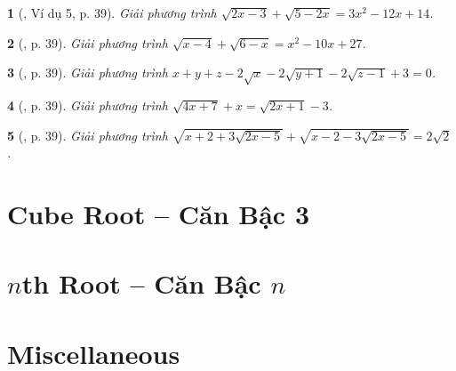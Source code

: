 \documentclass{article}
\newtheorem{baitoan}{}%
\begin{document}
\begin{baitoan}[\cite{Binh_boi_duong_Toan_9_tap_1}, Ví dụ 5, p. 39]
	Giải phương trình $\sqrt{2x - 3} + \sqrt{5 - 2x} = 3x^2 - 12x + 14$.
\end{baitoan}

\begin{baitoan}[\cite{Binh_boi_duong_Toan_9_tap_1}, p. 39]
	Giải phương trình $\sqrt{x - 4} + \sqrt{6 - x} = x^2 - 10x + 27$.
\end{baitoan}

\begin{baitoan}[\cite{Binh_boi_duong_Toan_9_tap_1}, p. 39]
	Giải phương trình $x + y + z - 2\sqrt{x} -2\sqrt{y + 1} - 2\sqrt{z - 1} + 3 = 0$.
\end{baitoan}

\begin{baitoan}[\cite{Binh_boi_duong_Toan_9_tap_1}, p. 39]
	Giải phương trình $\sqrt{4x + 7} + x = \sqrt{2x + 1} - 3$.
\end{baitoan}

\begin{baitoan}[\cite{Binh_boi_duong_Toan_9_tap_1}, p. 39]
	Giải phương trình $\sqrt{x + 2 + 3\sqrt{2x - 5}} + \sqrt{x - 2 - 3\sqrt{2x - 5}} = 2\sqrt{2}$.
\end{baitoan}


\section{Cube Root -- Căn Bậc 3}


\section{$n$th Root -- Căn Bậc $n$}


\section{Miscellaneous}


\printbibliography[heading=bibintoc]
\end{document}
